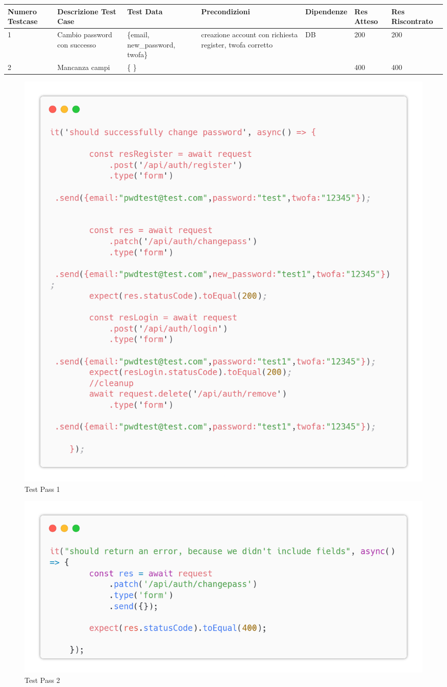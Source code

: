 \documentclass{report}
\begin{document}
\begin{center} %
	\centering
	\begin{tabular}{ |p{1cm}|p{2cm}|p{2cm}|p{2cm}|p{2cm}|p{1cm}|p{1cm}| }
		\hline
		Numero Testcase & Descrizione Test Case        & Test Data                       & Precondizioni                                            & Dipendenze & Res Atteso & Res Riscontrato \\
		\hline
		1               & Cambio password con successo & \{email, new\_password, twofa\} & creazione account con richiesta register, twofa corretto & DB         & 200        & 200             \\
		\hline
		2               & Mancanza campi               & \{ \}                           &                                                          &            & 400        & 400             \\
		\hline
	\end{tabular}
\end{center}
\begin{figure}[H]
	\centering\includegraphics[width=1\textwidth]{images/microservizio-autenticazione/tests/password_test_1.png}
	\caption{Test Pass 1}
\end{figure}
\begin{figure}[H]
	\centering\includegraphics[width=1\textwidth]{images/microservizio-autenticazione/tests/password_test_2.png}
	\caption{Test Pass 2}
\end{figure}
\end{document}
